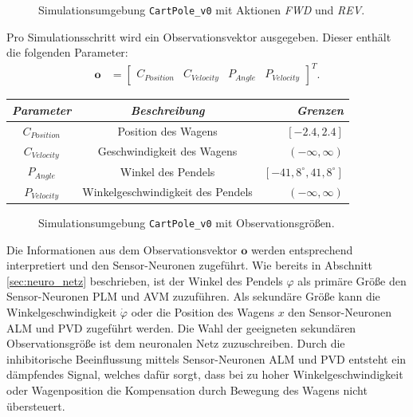 	\begin{figure}[H] %
		\centering
		\def\svgwidth{14cm}
		
		\caption{Simulationsumgebung \texttt{CartPole\_v0} mit Aktionen \textit{FWD} und \textit{REV}.}
		\label{fig:imp_cartpole_FWD_REV}
	\end{figure}
	Pro Simulationsschritt wird ein Observationsvektor ausgegeben. Dieser enthält die folgenden Parameter:
	\begin{align}
		\boldsymbol{o} &= \begin{bmatrix}C_{Position} & C_{Velocity} & P_{Angle} & P_{Velocity}\end{bmatrix}^T\text{.}
	\end{align}
	\begin{center}
		\begin{tabular}{c@{\hskip 0.5cm}c@{\hskip 0.5cm}r@{\hskip 0.5cm}}    \toprule
			\setlength{\tabcolsep}{50pt}
			\renewcommand{\arraystretch}{1.5}
			\emph{Parameter}	& \emph{Beschreibung}  				& \emph{Grenzen} 			\\\midrule
			$C_{Position}$		& Position des Wagens				& $[-2.4, 2.4]$				\\
			$C_{Velocity}$		& Geschwindigkeit des Wagens		& $(-\infty, \infty)$		\\
			$P_{Angle}$			& Winkel des Pendels				& $[-41,8^{\circ}, 41,8^{\circ}]$	\\
			$P_{Velocity}$		& Winkelgeschwindigkeit des Pendels	& $(-\infty, \infty)$		\\\bottomrule
			\hline
		\end{tabular}
	\end{center}
	\begin{figure}[!h] %
		\centering
		\def\svgwidth{14cm}
		
		\caption{Simulationsumgebung \texttt{CartPole\_v0} mit Observationsgrößen.}
		\label{fig:imp_cartpole_observation}
	\end{figure}
	Die Informationen aus dem Observationsvektor $\boldsymbol{o}$ werden entsprechend interpretiert und den Sensor-Neuronen zugeführt. Wie bereits in Abschnitt \ref{sec:neuro_netz} beschrieben, ist der Winkel des Pendels $\varphi$ als primäre Größe den Sensor-Neuronen PLM und AVM zuzuführen. Als sekundäre Größe kann die Winkelgeschwindigkeit $\dot{\varphi}$ oder die Position des Wagens $x$ den Sensor-Neuronen ALM und PVD zugeführt werden. Die Wahl der geeigneten sekundären Observationsgröße ist dem neuronalen Netz zuzuschreiben. Durch die inhibitorische Beeinflussung mittels Sensor-Neuronen ALM und PVD entsteht ein dämpfendes Signal, welches dafür sorgt, dass bei zu hoher Winkelgeschwindigkeit oder Wagenposition die Kompensation durch Bewegung des Wagens nicht übersteuert.

